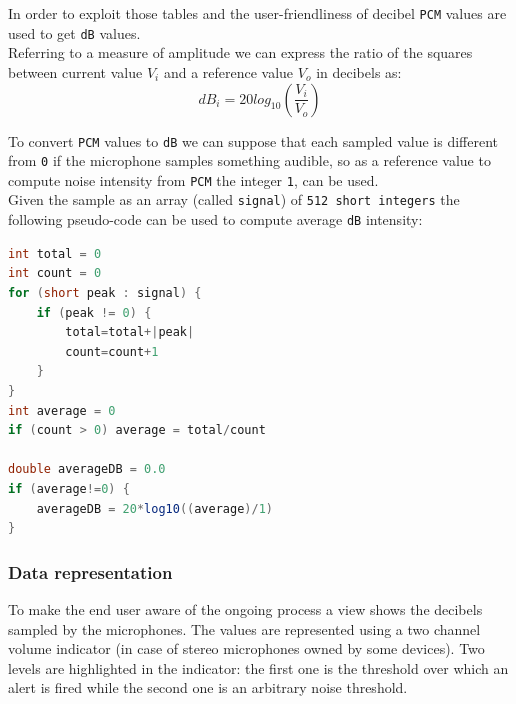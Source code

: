 \documentclass[conference, 11pt]{IEEEtran}
\begin{document}
In order to exploit those tables and the user-friendliness of decibel \texttt{PCM} values are used to get \texttt{dB} values.\\ 
Referring to a measure of amplitude we can express the ratio of the squares between current value $V_i$ and a reference value $V_o$ in decibels as:\\

\begin{equation}
dB_i = 20log_{10} \left(\frac{V_i}{V_o}\right)
\end{equation}

To convert \texttt{PCM} values to \texttt{dB} we can suppose that each sampled value is different from \texttt{0} if the microphone samples something audible, so as a reference value to compute noise intensity from \texttt{PCM} the integer \texttt{1}, can be used.\\

Given the sample as an array (called \texttt{signal}) of \texttt{512 short integers} the following pseudo-code can be used to compute average \texttt{dB} intensity:

\begin{lstlisting}[language=Java, caption=Pseudocode for computing dB from PCM samples]
int total = 0
int count = 0
for (short peak : signal) {
	if (peak != 0) {
		total=total+|peak|
		count=count+1
	}
}
int average = 0
if (count > 0) average = total/count

double averageDB = 0.0
if (average!=0) {
	averageDB = 20*log10((average)/1)
}
\end{lstlisting}

\subsubsection{\textbf{Data representation}}

To make the end user aware of the ongoing process a view shows the decibels sampled by the microphones. The values are represented using a two channel volume indicator (in case of stereo microphones owned by some devices). Two levels are highlighted in the indicator: the first one is the threshold over which an alert is fired while the second one is an arbitrary noise threshold.
\end{document}
